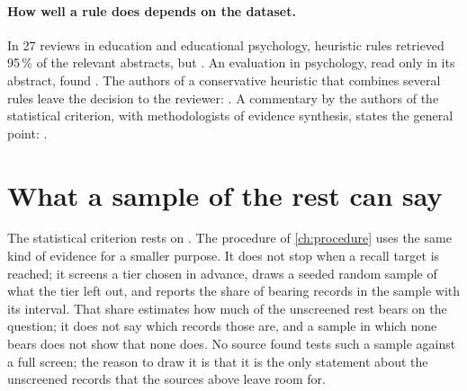 \paragraph{How well a rule does depends on the dataset.}
In 27 reviews in education and educational psychology, heuristic rules
retrieved 95\,\% of the relevant abstracts, but
.
An evaluation in psychology, read only in its abstract, found
.
The authors of a conservative heuristic that combines several rules leave
the decision to the reviewer:
.
A commentary by the authors of the statistical criterion, with
methodologists of evidence synthesis, states the general point:
.

\section{What a sample of the rest can say}
\label{sec:stopping-sample}

The statistical criterion rests on
.
The procedure of \cref{ch:procedure} uses the same kind of evidence for a
smaller purpose.
It does not stop when a recall target is reached; it screens a tier
chosen in advance, draws a seeded random sample of what the tier left
out, and reports the share of bearing records in the sample with its
interval.
That share estimates how much of the unscreened rest bears on the
question; it does not say which records those are, and a sample in which
none bears does not show that none does.
No source found tests such a sample against a full screen; the reason to
draw it is that it is the only statement about the unscreened records
that the sources above leave room for.

